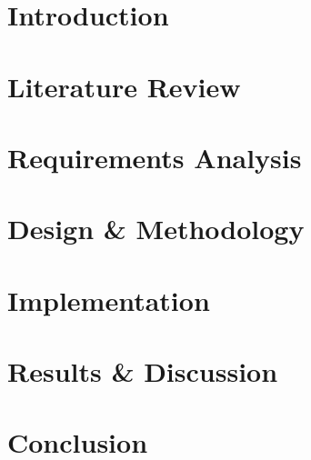 \documentclass[harvard]{lincolncsthesis}
\begin{document}
\maketitle





\thesisTables
\thesisBodyStart

\chapter{Introduction}


\chapter{Literature Review}


\chapter{Requirements Analysis}


\chapter{Design \& Methodology}


\chapter{Implementation}


\chapter{Results \& Discussion}


\chapter{Conclusion}


\printReferences

\printLudography
\end{document}
